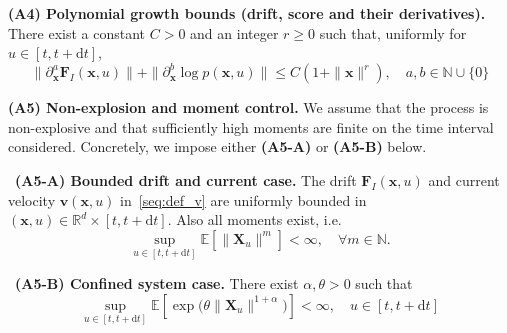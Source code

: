 \documentclass[
 longbibliography,
 twocolumn,
 superscriptaddress,
 amsmath,
 amssymb,
 amsthm,
 amsfonts,
 prl,
 floatfix,
]{revtex4-2}
\begin{document}
\begin{widetext}
\bigskip
\hypertarget{assumption:A4}{}
\noindent\textbf{(A4) Polynomial growth bounds (drift, score and their derivatives).} There exist a constant $C>0$ and an integer $r\geq0$ such that, uniformly for $u\in[t,t+\mathrm{d}t]$,
\begin{equation*}
    \|\partial_{\bm{x}}^a \bm{F}_I(\bm{x},u)\|
    +\|\partial_{\bm x}^b \log p(\bm x,u)\|
    \leq
    C(1+\| \bm{x}\|^r),
    \quad
    a,b\in\mathbb N\cup\{0\}
\end{equation*}

\hypertarget{assumption:A5}{}
\noindent\textbf{(A5) Non-explosion and moment control.}
We assume that the process is non-explosive and that sufficiently high moments are finite on the time interval considered. Concretely, we impose either \textbf{(A5-A)} or \textbf{(A5-B)} below.

\medskip
\hypertarget{assumption:A5-A}{}
\noindent\textbullet\ \textbf{(A5-A) Bounded drift and current case.}
The drift $\bm F_I(\bm x,u)$ and current velocity $\bm v(\bm x,u)$ in~\eqref{seq:def_v} are uniformly bounded in $(\bm x,u)\in\mathbb R^d\times[t,t+\mathrm dt]$. Also all moments exist, i.e.
\begin{equation*}
    \sup_{u\in[t,t+\mathrm{d}t]}\mathbb{E}\!\left[\|\bm X_u\|^{m}\right]<\infty,
    \quad\forall m\in\mathbb N.
\end{equation*}

\hypertarget{assumption:A5-B}{}
\noindent\textbullet\ \textbf{(A5-B) Confined system case.}
There exist $\alpha,\theta>0$ such that 
\begin{equation*}
    \sup_{u\in[t,t+\mathrm{d}t]}\mathbb{E}\!
    \left[\exp\!\big(\theta\|\bm X_u\|^{1+\alpha}\big)\right]<\infty,
    \quad u\in[t,t+\mathrm dt]
\end{equation*}


\end{widetext}
\end{document}
